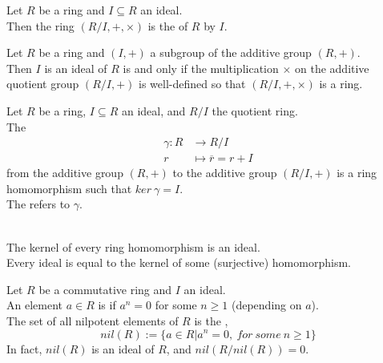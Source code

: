 \begin{definition}
Let $R$ be a ring and $I \subseteq R$ an ideal.\\
Then the ring $(R/I, +, \times)$ is the  of $R$ by $I$.\\
\end{definition}


\begin{remark}
Let $R$ be a ring and $(I, +)$ a subgroup of the additive group $(R, +)$.\\
Then $I$ is an ideal of $R$ is and only if the multiplication $\times$ on the additive quotient group $(R/I, +)$ is well-defined so that $(R/I, +, \times)$ is a ring.\\	
\end{remark}


\begin{definition}
Let $R$ be a ring, $I \subseteq R$ an ideal, and $R/I$ the quotient ring.\\
The  
\begin{align}
\gamma: R &\rightarrow R/I \nonumber \\
r &\mapsto \overline{r} = r + I \nonumber
\end{align}
from the additive group $(R, +)$ to the additive group $(R/I, +)$ is a ring homomorphism such that $ker \ \gamma = I$.\\
The  refers to $\gamma$.\\
\end{definition}


\begin{remark}
\\
The kernel of every ring homomorphism is an ideal.\\
Every ideal is equal to the kernel of some (surjective) homomorphism.\\
\end{remark}


\begin{definition}
Let $R$ be a commutative ring and $I$ an ideal.\\
An element $a \in R$ is 	 if $a^n = 0$ for some $n \geq 1$ (depending on $a$).\\
The set of all nilpotent elements of $R$ is the 	, 
\begin{equation}
nil(R) := \{a \in R | a^n = 0, \ for \ some \ n \geq 1 \} \nonumber	
\end{equation}
In fact, $nil(R)$ is an ideal of $R$, and $nil(R/nil(R)) = 0$.\\
\end{definition}


